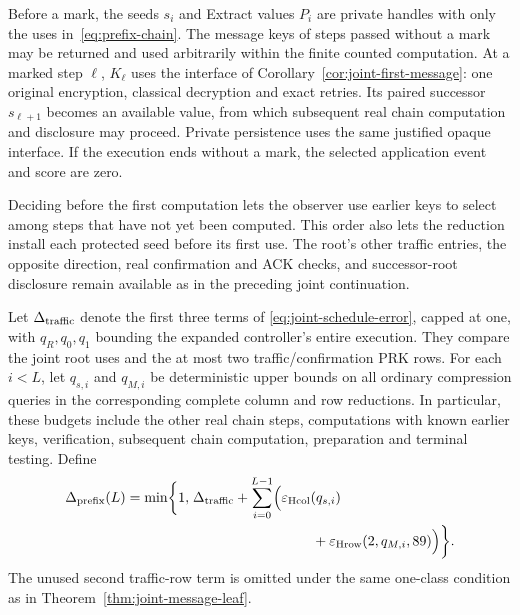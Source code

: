 Before a mark, the seeds $s_i$ and Extract values $P_i$ are private
handles with only the uses in~\eqref{eq:prefix-chain}. The message keys
of steps passed without a mark may be returned and used arbitrarily
within the finite counted computation. At a marked step $\ell$, $K_\ell$
uses the interface of Corollary~\ref{cor:joint-first-message}: one original
encryption, classical decryption and exact retries. Its paired successor
$s_{\ell+1}$ becomes an available value, from which subsequent real chain
computation and disclosure may proceed. Private persistence uses the
same justified opaque interface. If the execution ends without a mark,
the selected application event and score are zero.

Deciding before the first computation lets the observer use earlier keys
to select among steps that have not yet been computed. This order also
lets the reduction install each protected seed before its first use. The
root's other traffic entries, the opposite direction, real confirmation and ACK checks,
and successor-root disclosure remain available as in the preceding joint
continuation.

Let $\Delta_{\rm traffic}$ denote the first three terms of
\eqref{eq:joint-schedule-error}, capped at one, with $q_R,q_0,q_1$
bounding the expanded controller's entire execution. They compare the joint
root uses and the at most two traffic/confirmation PRK rows. For each
$i<L$, let $q_{s,i}$ and $q_{M,i}$ be deterministic upper bounds on
all ordinary compression queries in the corresponding complete
column and row reductions. In particular, these budgets include the
other real chain steps, computations with known earlier keys, verification, subsequent
chain computation, preparation and terminal testing. Define
\begin{equation}
\begin{split}
 \Delta_{\rm prefix}(L)=\min\biggl\{1,\;&\Delta_{\rm traffic}
  +\sum_{i=0}^{L-1}\Bigl(
       \varepsilon_{\rm Hcol}(q_{s,i})\\
 &\hspace{30mm}+\varepsilon_{\rm Hrow}(2,q_{M,i},89)
                         \Bigr)\biggr\}.
\end{split}
\label{eq:prefix-error}
\end{equation}
The unused second traffic-row term is omitted under the same
one-class condition as in Theorem~\ref{thm:joint-message-leaf}.

